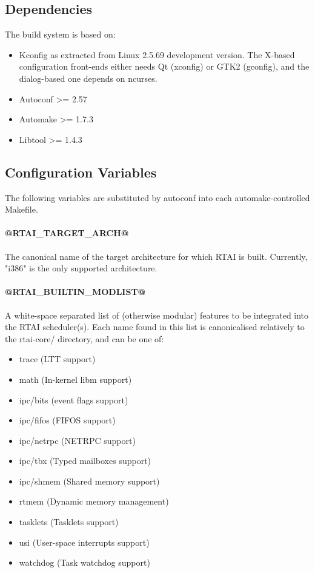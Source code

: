 \subsection{Dependencies}

The build system is based on:

\begin{itemize}
\item Kconfig as extracted from Linux 2.5.69 development version. The
X-based configuration front-ends either needs Qt (xconfig) or GTK2
(gconfig), and the dialog-based one depends on ncurses.
\item Autoconf >= 2.57
\item Automake >= 1.7.3
\item Libtool >= 1.4.3
\end{itemize}


\subsection{Configuration Variables}

The following variables are substituted by autoconf into each
automake-controlled Makefile.

\paragraph{@RTAI\_TARGET\_ARCH@} The canonical name of the target 
architecture for which RTAI is built. Currently, "i386" is the 
only supported architecture.

\paragraph{@RTAI\_BUILTIN\_MODLIST@}
A white-space separated list of (otherwise modular) features
to be integrated into the RTAI scheduler(s). Each name found
in this list is canonicalised relatively to the rtai-core/
directory, and can be one of:

\begin{itemize}
\item trace (LTT support)
\item math (In-kernel libm support)
\item ipc/bits (event flags support)
\item ipc/fifos (FIFOS support)
\item ipc/netrpc (NETRPC support)
\item ipc/tbx (Typed mailboxes support)
\item ipc/shmem (Shared memory support)
\item rtmem (Dynamic memory management)
\item tasklets (Tasklets support)
\item usi (User-space interrupts support)
\item watchdog (Task watchdog support)
\end{itemize}


